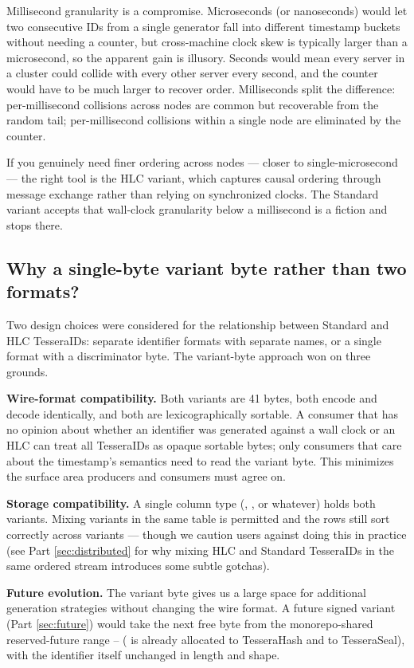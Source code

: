 Millisecond granularity is a compromise. Microseconds (or nanoseconds) would let two consecutive IDs from a single generator fall into different timestamp buckets without needing a counter, but cross-machine clock skew is typically larger than a microsecond, so the apparent gain is illusory. Seconds would mean every server in a cluster could collide with every other server every second, and the counter would have to be much larger to recover order. Milliseconds split the difference: per-millisecond collisions across nodes are common but recoverable from the random tail; per-millisecond collisions within a single node are eliminated by the counter.

If you genuinely need finer ordering across nodes --- closer to single-microsecond --- the right tool is the HLC variant, which captures causal ordering through message exchange rather than relying on synchronized clocks. The Standard variant accepts that wall-clock granularity below a millisecond is a fiction and stops there.

\subsection{Why a single-byte variant byte rather than two formats?}

Two design choices were considered for the relationship between Standard and HLC TesseraIDs: separate identifier formats with separate names, or a single format with a discriminator byte. The variant-byte approach won on three grounds.

\textbf{Wire-format compatibility.} Both variants are 41 bytes, both encode and decode identically, and both are lexicographically sortable. A consumer that has no opinion about whether an identifier was generated against a wall clock or an HLC can treat all TesseraIDs as opaque sortable bytes; only consumers that care about the timestamp's semantics need to read the variant byte. This minimizes the surface area producers and consumers must agree on.

\textbf{Storage compatibility.} A single column type (, , or whatever) holds both variants. Mixing variants in the same table is permitted and the rows still sort correctly across variants --- though we caution users against doing this in practice (see Part \ref{sec:distributed} for why mixing HLC and Standard TesseraIDs in the same ordered stream introduces some subtle gotchas).

\textbf{Future evolution.} The variant byte gives us a large space for additional generation strategies without changing the wire format. A future signed variant (Part \ref{sec:future}) would take the next free byte from the monorepo-shared reserved-future range -- ( is already allocated to TesseraHash and  to TesseraSeal), with the identifier itself unchanged in length and shape.

